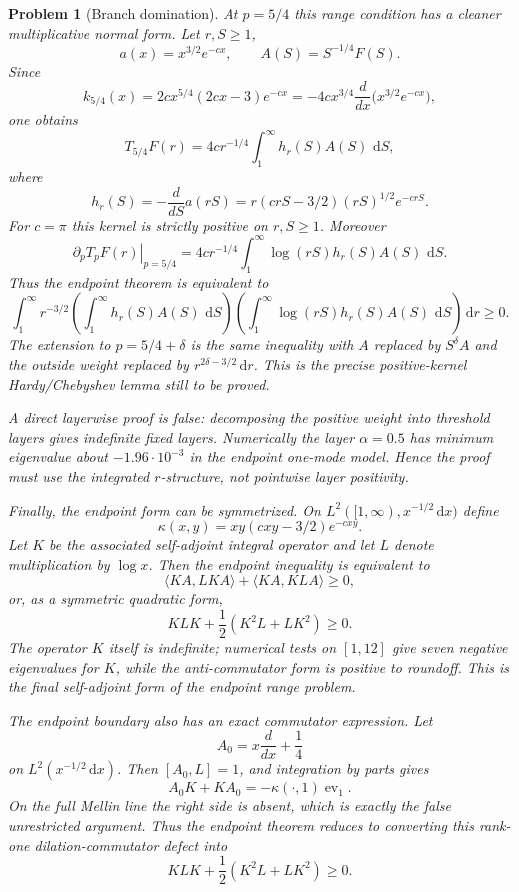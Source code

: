 \documentclass[11pt]{article}
\newtheorem{problem}[theorem]{Problem}
\newcommand{\dd}{\,\mathrm d}
\begin{document}
\begin{problem}[Branch domination]
At $p=5/4$ this range condition has a cleaner multiplicative normal form.  Let
$r,S\ge1$,
\[
  a(x)=x^{3/2}e^{-cx},\qquad A(S)=S^{-1/4}F(S).
\]
Since
\[
  k_{5/4}(x)
  =
  2cx^{5/4}(2cx-3)e^{-cx}
  =
  -4cx^{3/4}\frac{d}{dx}\bigl(x^{3/2}e^{-cx}\bigr),
\]
one obtains
\[
  T_{5/4}F(r)
  =
  4cr^{-1/4}\int_1^\infty h_r(S)A(S)\,\dd S,
\]
where
\[
  h_r(S)
  =
  -\frac{d}{dS}a(rS)
  =
  r(crS-3/2)(rS)^{1/2}e^{-crS}.
\]
For $c=\pi$ this kernel is strictly positive on $r,S\ge1$.  Moreover
\[
  \left.\partial_pT_pF(r)\right|_{p=5/4}
  =
  4cr^{-1/4}\int_1^\infty \log(rS)h_r(S)A(S)\,\dd S.
\]
Thus the endpoint theorem is equivalent to
\[
 \int_1^\infty r^{-3/2}
 \left(\int_1^\infty h_r(S)A(S)\,\dd S\right)
 \left(\int_1^\infty \log(rS)h_r(S)A(S)\,\dd S\right)\dd r
 \ge0.
\]
The extension to $p=5/4+\delta$ is the same inequality with
$A$ replaced by $S^\delta A$ and the outside weight replaced by
$r^{2\delta-3/2}\dd r$.  This is the precise positive-kernel Hardy/Chebyshev
lemma still to be proved.

A direct layerwise proof is false: decomposing the positive weight into
threshold layers gives indefinite fixed layers.  Numerically the layer
$\alpha=0.5$ has minimum eigenvalue about $-1.96\cdot10^{-3}$ in the endpoint
one-mode model.  Hence the proof must use the integrated $r$-structure, not
pointwise layer positivity.

Finally, the endpoint form can be symmetrized.  On
$L^2([1,\infty),x^{-1/2}\dd x)$ define
\[
  \kappa(x,y)=xy(cxy-3/2)e^{-cxy}.
\]
Let $K$ be the associated self-adjoint integral operator and let
$L$ denote multiplication by $\log x$.  Then the endpoint inequality is
equivalent to
\[
  \langle KA,LKA\rangle+\langle KA,KLA\rangle\ge0,
\]
or, as a symmetric quadratic form,
\[
  KLK+\frac12(K^2L+LK^2)\ge0.
\]
The operator $K$ itself is indefinite; numerical tests on $[1,12]$ give seven
negative eigenvalues for $K$, while the anti-commutator form is positive to
roundoff.  This is the final self-adjoint form of the endpoint range problem.

The endpoint boundary also has an exact commutator expression.  Let
\[
  A_0=x\frac{d}{dx}+\frac14
\]
on $L^2(x^{-1/2}\dd x)$.  Then $[A_0,L]=1$, and integration by parts gives
\[
  A_0K+KA_0=-\kappa(\cdot,1)\operatorname{ev}_1 .
\]
On the full Mellin line the right side is absent, which is exactly the false
unrestricted argument.  Thus the endpoint theorem reduces to converting this
rank-one dilation-commutator defect into
\[
  KLK+\frac12(K^2L+LK^2)\ge0.
\]


\end{problem}
\end{document}
